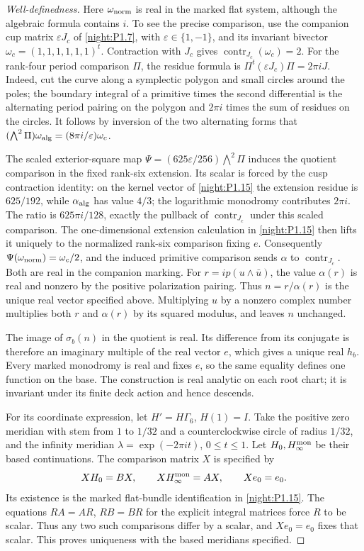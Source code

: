 \documentclass[11pt,a4paper]{article}
\numberwithin{equation}{section}
\theoremstyle{definition}
\begin{document}
\begin{proof}[Well-definedness]
Here $\omega_{\rm norm}$ is real in the marked flat system,
although the algebraic formula contains $i$. To see the precise
comparison, use the companion cup matrix $\varepsilon J_c$ of
\cref{night:P1.7}, with $\varepsilon\in\{1,-1\}$, and its
invariant bivector $\omega_c=(1,1,1,1,1,1)^t$.
Contraction with $J_c$ gives $\operatorname{contr}_{J_c}(\omega_c)=2$.
For the rank-four period comparison $\Pi$, the residue formula is
$\Pi^t(\varepsilon J_c)\Pi=2\pi iJ$.
Indeed, cut the curve along a symplectic polygon and small circles
around the poles; the boundary integral of a primitive times the
second differential is the alternating period pairing on the
polygon and $2\pi i$ times the sum of residues on the circles.
It follows by inversion of the two alternating forms that
$(\bigwedge^2\Pi)\omega_{\rm alg}=(8\pi i/\varepsilon)\omega_c$.

The scaled exterior-square map
$\Psi=(625\varepsilon/256)\bigwedge^2\Pi$ induces the
quotient comparison in the fixed rank-six extension. Its scalar is forced by the cusp contraction identity: on the
kernel vector of \cref{night:P1.15} the extension residue is
$625/192$, while $\alpha_{\rm alg}$ has value $4/3$; the
logarithmic monodromy contributes $2\pi i$. The ratio is
$625\pi i/128$, exactly the pullback of
$\operatorname{contr}_{J_c}$ under this scaled comparison.
The one-dimensional extension calculation in
\cref{night:P1.15} then lifts it uniquely to the normalized
rank-six comparison fixing $e$.
Consequently $\Psi(\omega_{\rm norm})=\omega_c/2$, and
the induced primitive comparison sends $\alpha$ to
$\operatorname{contr}_{J_c}$. Both are real in the companion
marking. For $r=ip(u\wedge\bar u)$, the value $\alpha(r)$
is real and nonzero by the positive polarization pairing.
Thus $n=r/\alpha(r)$ is the unique real vector specified above.
Multiplying $u$ by a nonzero complex number multiplies both
$r$ and $\alpha(r)$ by its squared modulus, and leaves $n$
unchanged.

The image of $\sigma_b(n)$ in the quotient is real. Its
difference from its conjugate is therefore an imaginary
multiple of the real vector $e$, which gives a unique real
$h_b$. Every marked monodromy is real and fixes $e$, so the
same equality defines one function on the base. The construction
is real analytic on each root chart; it is invariant under its
finite deck action and hence descends.

For its coordinate expression, let $H'=H\Gamma_6$, $H(1)=I$.
Take the positive zero meridian with stem from $1$ to $1/32$
and a counterclockwise circle of radius $1/32$, and the infinity
meridian $\lambda=\exp(-2\pi it)$, $0\le t\le1$.
Let $H_0,H_\infty^{\rm mon}$ be their based continuations.
The comparison matrix $X$ is specified by
\[
 XH_0=BX,\qquad XH_\infty^{\rm mon}=AX,\qquad Xe_0=e_0.
\]
Its existence is the marked flat-bundle identification in
\cref{night:P1.15}. The equations $RA=AR$, $RB=BR$ for the
explicit integral matrices force $R$ to be scalar. Thus any
two such comparisons differ by a scalar, and $Xe_0=e_0$ fixes
that scalar. This proves uniqueness with the based meridians
specified.


\end{proof}
\end{document}
